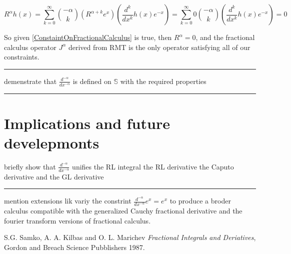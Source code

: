 \documentclass[%
 preprint,
 amsmath, amssymb, aps, pra, 10pt
]{revtex4-2}
\begin{document}
\[R^\alpha h(x) = \sum_{k=0}^\infty \binom{-\alpha}{k}\left( R^{\alpha + k}e^x \right)\left( \frac{d^k}{dx^k} h(x)e^{-x}\right) = \sum_{k=0}^\infty 0 \binom{-\alpha}{k}\left( \frac{d^k}{dx^k} h(x)e^{-x}\right) = 0\]

So given \eqref{ConstaintOnFractionalCalculus} is true, then $R^\alpha = 0$, and the fractional calculus operator $J^\alpha$ derived from RMT is the only operator satisfying all of our constraints.

\noindent\rule{\textwidth}{1pt}

demenstrate that $\frac{d^{-\alpha}}{dx^{-\alpha}}$ is defined on $\mathbb{S}$ with the required properties

\noindent\rule{\textwidth}{1pt}

\section{Implications and future develepmonts}
briefly show that $\frac{d^{-\alpha}}{dx^{-\alpha}}$ unifies the RL integral the RL derivative the Caputo derivative and the GL derivative

\noindent\rule{\textwidth}{1pt}

mention extensions lik variy  the constrint $\frac{d^{-\alpha}}{dx^{-\alpha}}e^x = e^x$ to produce a broder calculus compatible with the generalized Cauchy fractional derivative and the fourier transform versions of fractional calculus. 

\begin{thebibliography}{1}

  S.G. Samko, A. A. Kilbas and O. L. Marichev
  \textit{Fractional Integrals and Deriatives},
  Gordon and Breach Science Pubblishers
  1987.

\end{thebibliography}
\end{document}
